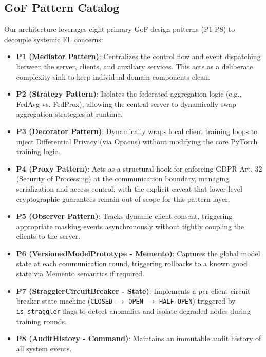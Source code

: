 \documentclass[10pt, conference]{IEEEtran}
\begin{document}
\subsection{GoF Pattern Catalog}
Our architecture leverages eight primary GoF design patterns (P1-P8) to decouple systemic FL concerns:
\begin{itemize}
    \item \textbf{P1 (Mediator Pattern)}: Centralizes the control flow and event dispatching between the server, clients, and auxiliary services. This acts as a deliberate complexity sink to keep individual domain components clean.
    \item \textbf{P2 (Strategy Pattern)}: Isolates the federated aggregation logic (e.g., FedAvg vs. FedProx), allowing the central server to dynamically swap aggregation strategies at runtime.
    \item \textbf{P3 (Decorator Pattern)}: Dynamically wraps local client training loops to inject Differential Privacy (via Opacus) without modifying the core PyTorch training logic.
    \item \textbf{P4 (Proxy Pattern)}: Acts as a structural hook for enforcing GDPR Art. 32 (Security of Processing) at the communication boundary, managing serialization and access control, with the explicit caveat that lower-level cryptographic guarantees remain out of scope for this pattern layer.
    \item \textbf{P5 (Observer Pattern)}: Tracks dynamic client consent, triggering appropriate masking events asynchronously without tightly coupling the clients to the server.
    \item \textbf{P6 (VersionedModelPrototype - Memento)}: Captures the global model state at each communication round, triggering rollbacks to a known good state via Memento semantics if required.
    \item \textbf{P7 (StragglerCircuitBreaker - State)}: Implements a per-client circuit breaker state machine (\texttt{CLOSED} $\rightarrow$ \texttt{OPEN} $\rightarrow$ \texttt{HALF-OPEN}) triggered by \texttt{is\_straggler} flags to detect anomalies and isolate degraded nodes during training rounds.
    \item \textbf{P8 (AuditHistory - Command)}: Maintains an immutable audit history of all system events.
\end{itemize}
\end{document}
